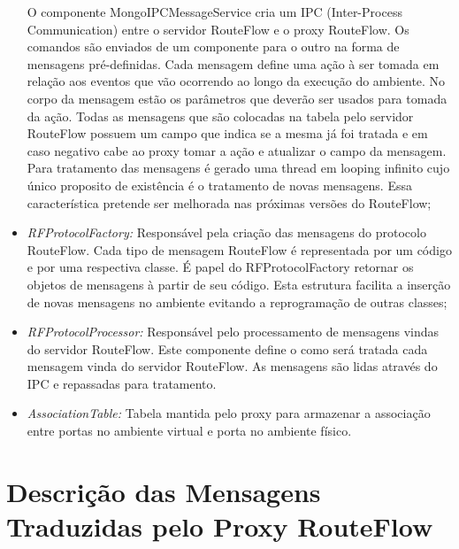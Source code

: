 \begin{itemize}
O componente MongoIPCMessageService 
cria um IPC (Inter-Process Communication) 
entre o servidor RouteFlow e o proxy RouteFlow. Os comandos são 
enviados de um componente para o outro 
na forma de mensagens pré-definidas. Cada mensagem define uma 
ação à ser tomada em relação aos eventos 
que vão ocorrendo ao longo da execução do ambiente. No corpo da 
mensagem estão os parâmetros que 
deverão ser usados para tomada da ação. Todas as mensagens que 
são colocadas na tabela pelo servidor RouteFlow 
possuem um campo que indica se a mesma já foi tratada e em caso 
negativo cabe ao proxy tomar a ação e 
atualizar o campo da mensagem. Para tratamento das mensagens é 
gerado uma thread em looping infinito 
cujo único proposito de existência é o tratamento de novas mensagens. 
Essa característica pretende ser melhorada nas próximas versões 
do RouteFlow;
\item \textit{RFProtocolFactory:} Responsável pela criação das 
mensagens do protocolo RouteFlow. Cada 
tipo de mensagem RouteFlow é representada por um código e 
por uma respectiva classe. É papel do 
RFProtocolFactory retornar os objetos de mensagens à partir de 
seu código. Esta estrutura facilita a 
inserção de novas mensagens no ambiente evitando a reprogramação 
de outras classes;
\item \textit{RFProtocolProcessor:} Responsável pelo processamento 
de mensagens vindas do servidor 
RouteFlow. Este componente define o como será tratada cada mensagem 
vinda do servidor RouteFlow. As 
mensagens são lidas através do IPC e repassadas para tratamento.
\item \textit{AssociationTable:} Tabela mantida pelo proxy para armazenar 
a associação entre portas no 
ambiente virtual e porta no ambiente físico.
\end{itemize} 

\section{Descrição das Mensagens Traduzidas pelo Proxy RouteFlow}

